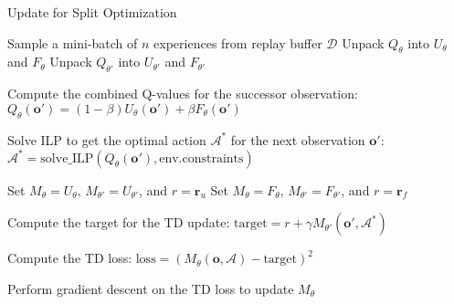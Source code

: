 
\begin{algorithm}[t]
\caption{Update for Split Optimization}
\label{alg:SOUpdate}
\begin{algorithmic}[1]
    \State Sample a mini-batch of $n$ experiences from replay buffer $\mathcal{D}$
    \State Unpack $Q_\theta$ into $U_\theta$ and $F_\theta$
    \State Unpack $Q_{\theta'}$ into $U_{\theta'}$ and $F_{\theta'}$
    
        
        \State Compute the combined Q-values for the successor observation:
        \State \hspace{1em} $Q_\theta(\mathbf{o}') = (1 - \beta)  U_\theta(\mathbf{o}') + \beta  F_\theta(\mathbf{o}')$
        
        \State Solve ILP to get the optimal action $\mathcal{A}^*$ for the next observation $\mathbf{o}'$:
        \State \hspace{1em} $\mathcal{A}^* = \text{solve\_ILP}(Q_\theta(\mathbf{o}'), \text{env.constraints})$
        
                \State Set $M_\theta = U_\theta$, $M_{\theta'} = U_{\theta'}$, and $r = \mathbf{r}_u$
            \Else
                \State Set $M_\theta = F_\theta$, $M_{\theta'} = F_{\theta'}$, and $r = \mathbf{r}_f$
            \EndIf
            
            \State Compute the target for the TD update:
            \State \hspace{1em} $\text{target} = r + \gamma  M_{\theta'}(\mathbf{o}', \mathcal{A}^*)$
            
            \State Compute the TD loss:
            \State \hspace{1em} $\text{loss} = \left( M_\theta(\mathbf{o}, \mathcal{A}) - \text{target} \right)^2$
            
            \State Perform gradient descent on the TD loss to update $M_\theta$
        \EndFor
    \EndFor
    
\EndFunction
\end{algorithmic}
\end{algorithm}